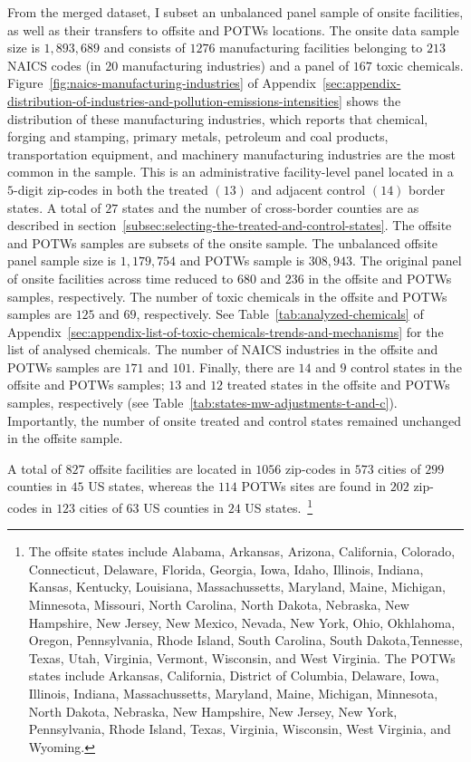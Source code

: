 \documentclass[12pt, english]{article}
\begin{document}
    From the merged dataset, I subset an unbalanced panel sample of onsite facilities, as well as their transfers to offsite and POTWs locations. The onsite data sample size is $1,893,689$ and consists of $1276$ manufacturing facilities belonging to $213$ NAICS codes (in $20$ manufacturing industries) and a panel of $167$ toxic chemicals. Figure~\ref{fig:naics-manufacturing-industries} of Appendix~\ref{sec:appendix-distribution-of-industries-and-pollution-emissions-intensities} shows the distribution of these manufacturing industries, which reports that chemical, forging and stamping, primary metals, petroleum and coal products, transportation equipment, and machinery manufacturing industries are the most common in the sample. This is an administrative facility-level panel located in a $5$-digit zip-codes in both the treated $(13)$ and adjacent control $(14)$ border states. A total of $27$ states and the number of cross-border counties are as described in section~\ref{subsec:selecting-the-treated-and-control-states}. The offsite and POTWs samples are subsets of the onsite sample. The unbalanced offsite panel sample size is $1,179,754$ and POTWs sample is $308,943$. The original panel of onsite facilities across time reduced to $680$ and $236$ in the offsite and POTWs samples, respectively. The number of toxic chemicals in the offsite and POTWs samples are $125$ and $69$, respectively. See Table~\ref{tab:analyzed-chemicals} of Appendix~\ref{sec:appendix-list-of-toxic-chemicals-trends-and-mechanisms} for the list of analysed chemicals. The number of NAICS industries in the offsite and POTWs samples are $171$ and $101$. Finally, there are $14$ and $9$ control states in the offsite and POTWs samples; $13$ and $12$ treated states in the offsite and POTWs samples, respectively (see Table~\ref{tab:states-mw-adjustments-t-and-c}). Importantly, the number of onsite treated and control states remained unchanged in the offsite sample.

    A total of $827$ offsite facilities are located in $1056$ zip-codes in $573$ cities of $299$ counties in $45$ US states, whereas the $114$ POTWs sites are found in $202$ zip-codes in $123$ cities of $63$ US counties in $24$ US states.~\footnote{\tiny The offsite states include Alabama, Arkansas, Arizona, California, Colorado, Connecticut, Delaware, Florida, Georgia, Iowa, Idaho, Illinois, Indiana, Kansas, Kentucky, Louisiana, Massachussetts, Maryland, Maine, Michigan, Minnesota, Missouri, North Carolina, North Dakota, Nebraska, New Hampshire, New Jersey, New Mexico, Nevada, New York, Ohio, Okhlahoma, Oregon, Pennsylvania, Rhode Island, South Carolina, South Dakota,Tennesse, Texas, Utah, Virginia, Vermont, Wisconsin, and West Virginia. The POTWs states include Arkansas, California, District of Columbia, Delaware, Iowa, Illinois, Indiana, Massachussetts, Maryland, Maine, Michigan, Minnesota, North Dakota, Nebraska, New Hampshire, New Jersey, New York, Pennsylvania, Rhode Island, Texas, Virginia, Wisconsin, West Virginia, and Wyoming.}
\end{document}
